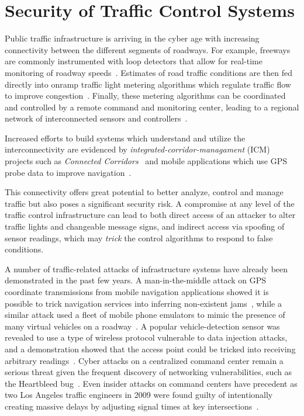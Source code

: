 \chapter{Security of Traffic Control Systems}
\label{chapter:security}

Public traffic infrastructure is arriving in the cyber age with increasing connectivity between the different segments of roadways. For example, freeways are commonly instrumented with loop detectors that allow for real-time monitoring of roadway speeds~\cite{jia2001pems}. Estimates of road traffic conditions are then fed directly into onramp traffic light metering algorithms which regulate traffic flow to improve congestion~\cite{Papageorgiou1991}. Finally, these metering algorithms can be coordinated and controlled by a remote command and monitoring center, leading to a regional network of interconnected sensors and controllers~\cite{Reilly2013b}.

Increased efforts to build systems which understand and utilize the interconnectivity are evidenced by \emph{integrated-corridor-managament} (ICM) projects such as \emph{Connected Corridors}~\cite{miller2010san} and mobile applications which use GPS probe data to improve navigation~\cite{work2010traffic}.

This connectivity offers great potential to better analyze, control and manage traffic but also poses a significant security risk. A compromise at any level of the traffic control infrastructure can lead to both direct access of an attacker to alter traffic lights and changeable message signs, and indirect access via spoofing of sensor readings, which may \emph{trick} the control algorithms to respond to false conditions.

A number of traffic-related attacks of infrastructure systems have already been demonstrated in the past few years. A man-in-the-middle attack on GPS coordinate transmissions from mobile navigation applications showed it is possible to trick navigation services into inferring non-existent jams~\cite{jeske2013floating}, while a similar attack used a fleet of mobile phone emulators to mimic the presence of many virtual vehicles on a roadway~\cite{TUFNELL2014}. A popular vehicle-detection sensor was revealed to use a type of wireless protocol vulnerable to data injection attacks, and a demonstration showed that the access point could be tricked into receiving arbitrary readings~\cite{Zetter2014Custom}. Cyber attacks on a centralized command center remain a serious threat given the frequent discovery of networking vulnerabilities, such as the Heartbleed bug~\cite{Codenomicon2014}. Even insider attacks on command centers have precedent as two Los Angeles traffic engineers in 2009 were found guilty of intentionally creating massive delays by adjusting signal times at key intersections~\cite{Grad2009Custom}.


